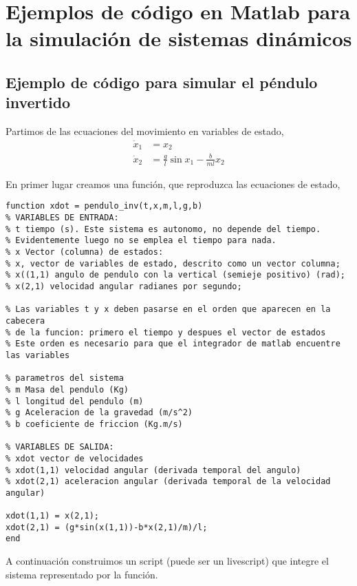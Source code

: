 \appendix
\chapter[Ejemplos de codigo de simulación]{Ejemplos de código en Matlab para la simulación de sistemas dinámicos}\label{apend1}

\section[Código para el péndulo invertido]{Ejemplo de código para simular el péndulo invertido}\label{Apinv}
Partimos de las ecuaciones del movimiento en variables de estado,
\begin{align*}
\dot x_1 &= x_2\\
\dot x_2 &= \frac{g}{l}\sin x_1 - \frac{b}{ml}x_2
\end{align*}

En primer lugar creamos una función, que reproduzca las ecuaciones de estado, 
\begin{lstlisting}
function xdot = pendulo_inv(t,x,m,l,g,b)
% VARIABLES DE ENTRADA:
% t tiempo (s). Este sistema es autonomo, no depende del tiempo. 
% Evidentemente luego no se emplea el tiempo para nada.
% x Vector (columna) de estados: 
% x, vector de variables de estado, descrito como un vector columna;  
% x((1,1) angulo de pendulo con la vertical (semieje positivo) (rad);
% x(2,1) velocidad angular radianes por segundo;

% Las variables t y x deben pasarse en el orden que aparecen en la cabecera
% de la funcion: primero el tiempo y despues el vector de estados
% Este orden es necesario para que el integrador de matlab encuentre las variables

% parametros del sistema
% m Masa del pendulo (Kg)
% l longitud del pendulo (m)
% g Aceleracion de la gravedad (m/s^2)
% b coeficiente de friccion (Kg.m/s)

% VARIABLES DE SALIDA:
% xdot vector de velocidades 
% xdot(1,1) velocidad angular (derivada temporal del angulo)
% xdot(2,1) aceleracion angular (derivada temporal de la velocidad angular)

xdot(1,1) = x(2,1);
xdot(2,1) = (g*sin(x(1,1))-b*x(2,1)/m)/l;
end
\end{lstlisting}

A continuación construimos un script (puede ser un livescript) que integre el sistema representado por la función.

